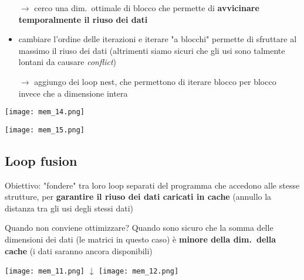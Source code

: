 \begin{example}[frametitle={Esempio: Matrix multiplication}]
  \begin{itemize}
    \item[$\rightarrow$] cerco una dim.~ottimale di blocco che permette di \textbf{avvicinare temporalmente il riuso dei dati}
    \item cambiare l'ordine delle iterazioni e iterare "a blocchi" permette di sfruttare al massimo il riuso dei dati (altrimenti siamo sicuri che gli usi sono talmente lontani da causare \textit{conflict})
    \item[$\rightarrow$] aggiungo dei loop nest, che permettono di iterare blocco per blocco invece che a dimensione intera
  \end{itemize}

\begin{center}
  \begin{minipage}[c]{.4\textwidth}
  \texttt{[image: mem\_14.png]}
  \end{minipage}
  \begin{minipage}[c]{.4\textwidth}
  \texttt{[image: mem\_15.png]}
  \end{minipage}
  
\end{center}


\end{example}

\subsection{Loop fusion}

\noindent\begin{minipage}[c]{.65\textwidth}
Obiettivo: "fondere" tra loro loop separati del programma che accedono alle stesse strutture, per \textbf{garantire il riuso dei dati caricati in cache} (annullo la distanza tra gli usi degli stessi dati)

\begin{emphasize}
    Quando non conviene ottimizzare? Quando sono sicuro che la somma delle dimensioni dei dati (le matrici in questo caso) \`e \textbf{minore della dim.~della cache} (i dati saranno ancora disponibili)
\end{emphasize}
\end{minipage}\hfill
\begin{minipage}[c]{.3\textwidth}
  \centering
\texttt{[image: mem\_11.png]}
$\downarrow$
\texttt{[image: mem\_12.png]}
\end{minipage}

